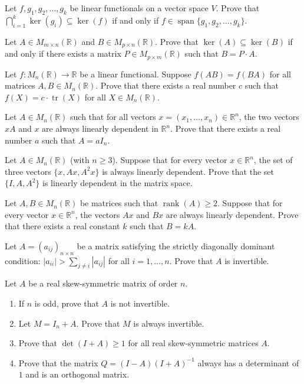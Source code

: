 \documentclass[12pt]{article}
\begin{document}
\begin{problems}
\item Let $f,g_1,g_2,\dots,g_k$ be linear functionals on a vector space $V$. Prove that $\displaystyle\bigcap_{i=1}^k \ker(g_i) \subseteq \ker(f)$ if and only if $f\in\operatorname{span}\{g_1,g_2,\dots,g_k\}$.

\item Let $A\in M_{m\times n}(\mathbb{R})$ and $B\in M_{p\times n}(\mathbb{R})$. Prove that $\ker(A)\subseteq \ker(B)$ if and only if there exists a matrix $P\in M_{p\times m}(\mathbb{R})$ such that $B=P\cdot A$.

\item Let $f:M_n(\mathbb{R})\to\mathbb{R}$ be a linear functional. Suppose $f(AB)=f(BA)$ for all matrices $A,B\in M_n(\mathbb{R})$. Prove that there exists a real number $c$ such that $f(X)=c\cdot\operatorname{tr}(X)$ for all $X\in M_n(\mathbb{R})$.

\item Let $A\in M_n(\mathbb{R})$ such that for all vectors $x=(x_1,\dots,x_n)\in\mathbb{R}^n$, the two vectors $xA$ and $x$ are always linearly dependent in $\mathbb{R}^n$. Prove that there exists a real number $a$ such that $A=aI_n$.

\item Let $A\in M_n(\mathbb{R})$ (with $n\ge 3$). Suppose that for every vector $x\in\mathbb{R}^n$, the set of three vectors $\{x,Ax,A^2x\}$ is always linearly dependent. Prove that the set $\{I,A,A^2\}$ is linearly dependent in the matrix space.

\item Let $A,B\in M_n(\mathbb{R})$ be matrices such that $\operatorname{rank}(A)\ge 2$. Suppose that for every vector $x\in\mathbb{R}^n$, the vectors $Ax$ and $Bx$ are always linearly dependent. Prove that there exists a real constant $k$ such that $B=kA$.

\item Let $A=(a_{ij})_{n\times n}$ be a matrix satisfying the strictly diagonally dominant condition: $|a_{ii}| > \sum_{j\ne i}|a_{ij}|$ for all $i=1,\dots,n$. Prove that $A$ is invertible.

\item Let $A$ be a real skew-symmetric matrix of order $n$.
\begin{enumerate}[label=(\alph*)]
\item If $n$ is odd, prove that $A$ is not invertible.
\item Let $M=I_n+A$. Prove that $M$ is always invertible.
\item Prove that $\det(I+A) \ge 1$ for all real skew-symmetric matrices $A$.
\item Prove that the matrix $Q=(I-A)(I+A)^{-1}$ always has a determinant of $1$ and is an orthogonal matrix.
\end{enumerate}


\end{problems}
\end{document}
